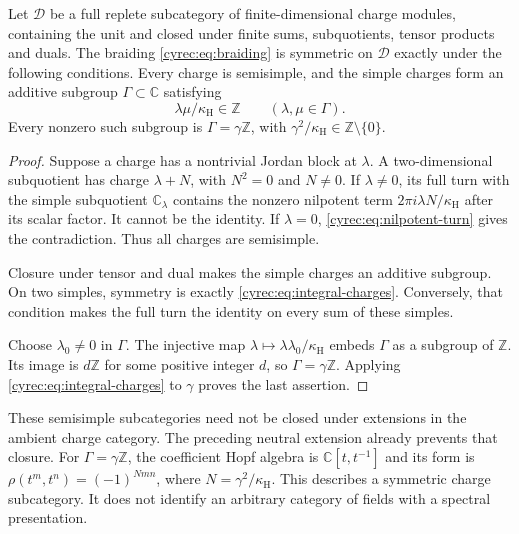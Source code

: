\begin{proposition}\label{cyrec:prop:symmetric-sectors}
Let $\mathcal D$ be a full replete subcategory of finite-dimensional
charge modules, containing the unit and closed under finite sums,
subquotients, tensor products and duals. The braiding \eqref{cyrec:eq:braiding} is symmetric on $\mathcal D$
exactly under the following conditions. Every charge is semisimple,
and the simple charges form an additive subgroup $\Gamma\subset\mathbb C$
satisfying
\begin{equation}\label{cyrec:eq:integral-charges}
 \lambda\mu/\kappa_{\mathrm H}\in\mathbb Z
                \qquad(\lambda,\mu\in\Gamma).
\end{equation}
Every nonzero such subgroup is $\Gamma=\gamma\mathbb Z$, with
$\gamma^2/\kappa_{\mathrm H}\in\mathbb Z\setminus\{0\}$.
\end{proposition}

\begin{proof}
Suppose a charge has a nontrivial Jordan block at $\lambda$.
A two-dimensional subquotient has charge $\lambda+N$, with
$N^2=0$ and $N\ne0$. If $\lambda\ne0$, its full turn with the
simple subquotient $\mathbb C_\lambda$ contains the nonzero
nilpotent term $2\pi i\lambda N/\kappa_{\mathrm H}$ after its
scalar factor. It cannot be the identity. If $\lambda=0$,
\eqref{cyrec:eq:nilpotent-turn} gives the contradiction.
Thus all charges are semisimple.

Closure under tensor and dual makes the simple charges an additive
subgroup. On two simples, symmetry is exactly
\eqref{cyrec:eq:integral-charges}. Conversely, that condition makes
the full turn the identity on every sum of these simples.

Choose $\lambda_0\ne0$ in $\Gamma$. The injective map
$\lambda\mapsto\lambda\lambda_0/\kappa_{\mathrm H}$ embeds
$\Gamma$ as a subgroup of $\mathbb Z$. Its image is $d\mathbb Z$
for some positive integer $d$, so $\Gamma=\gamma\mathbb Z$.
Applying \eqref{cyrec:eq:integral-charges} to $\gamma$ proves the
last assertion.
\end{proof}

These semisimple subcategories need not be closed under extensions
in the ambient charge category. The preceding neutral extension
already prevents that closure. For $\Gamma=\gamma\mathbb Z$,
the coefficient Hopf algebra is $\mathbb C[t,t^{-1}]$ and its
form is $\rho(t^m,t^n)=(-1)^{Nmn}$, where
$N=\gamma^2/\kappa_{\mathrm H}$. This describes a symmetric
charge subcategory. It does not identify an arbitrary category of
fields with a spectral presentation.

